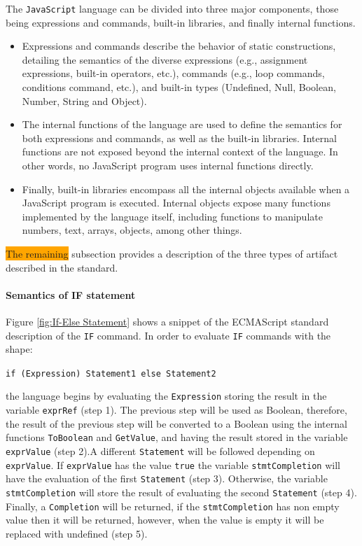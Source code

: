 \documentclass[runningheads]{llncs}
\begin{document}
The \texttt{JavaScript} language can be divided into three major components, those being expressions and commands, built-in libraries, and finally internal functions.
%
\begin{itemize}
\item Expressions and commands describe the behavior of static constructions, detailing the semantics of the diverse expressions (e.g., assignment expressions, built-in operators, etc.), commands (e.g., loop commands, conditions command, etc.), and built-in types (Undefined, Null, Boolean, Number, String and Object).
%
\item The internal functions of the language are used to define the semantics for both expressions and commands, as well as the built-in libraries. Internal functions are not exposed beyond the internal context of the language. In other words, no JavaScript program uses internal functions directly.
%
\item Finally, built-in libraries encompass all the internal objects available when a JavaScript program is executed. Internal objects expose many functions implemented by the language itself, including functions to manipulate numbers, text, arrays, objects, among other things.
\end{itemize}


\colorbox{orange}{The remaining} subsection provides a description of the three types of artifact described in the standard.

\paragraph{Semantics of IF statement}
Figure \ref{fig:If-Else Statement} shows a snippet of the ECMAScript standard description of the \texttt{IF} command. In order to evaluate \texttt{IF} commands with the shape:

\begin{center}
\texttt{if (Expression) Statement1 else Statement2}
\end{center}

\noindent the language begins by evaluating the \texttt{Expression} storing the result in the variable \texttt{exprRef} (step 1). The previous step will be used as Boolean, therefore, the result of the previous step will be converted to a Boolean using the internal functions \texttt{ToBoolean} and \texttt{GetValue}, and having the result stored in the variable \texttt{exprValue} (step 2).A different \texttt{Statement} will be followed depending on \texttt{exprValue}. If \texttt{exprValue} has the value \texttt{true} the variable \texttt{stmtCompletion} will have the evaluation of the first \texttt{Statement} (step 3). Otherwise, the variable \texttt{stmtCompletion} will store the result of evaluating the second \texttt{Statement} (step 4). Finally, a \texttt{Completion} will be returned, if the \texttt{stmtCompletion} has non empty value then it will be returned, however, when the value is empty it will be replaced with undefined (step 5).
\end{document}
